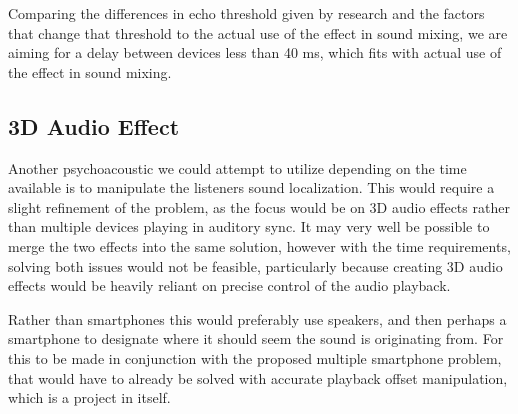 Comparing the differences in echo threshold given by research and the factors that change that threshold to the actual use of the effect in sound mixing, we are aiming for a delay between devices less than 40 ms, which fits with actual use of the effect in sound mixing.

\subsection{3D Audio Effect}
Another psychoacoustic we could attempt to utilize depending on the time available is to manipulate the listeners sound localization.
This would require a slight refinement of the problem, as the focus would be on 3D audio effects rather than multiple devices playing in auditory sync.
It may very well be possible to merge the two effects into the same solution, however with the time requirements, solving both issues would not be feasible, particularly because creating 3D audio effects would be heavily reliant on precise control of the audio playback.

Rather than smartphones this would preferably use speakers, and then perhaps a smartphone to designate where it should seem the sound is originating from.
For this to be made in conjunction with the proposed multiple smartphone problem, that would have to already be solved with accurate playback offset manipulation, which is a project in itself.
